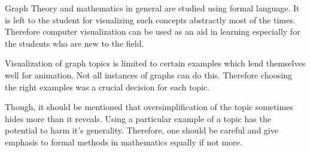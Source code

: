 Graph Theory and mathematics in general are studied using formal language. It
is left to the student for visualizing such concepts abstractly most of the
times. Therefore computer visualization can be used as an aid in learning
especially for the students who are new to the field.

Visualization of graph topics is limited to certain examples which lend
themselves well for animation. Not all instances of graphs can do this.
Therefore choosing the right examples was a crucial decision for each topic.

Though, it should be mentioned that oversimplification of the topic sometimes
hides more than it reveals. Using a particular example of a topic has the
potential to harm it's generality. Therefore, one should be careful and give
emphasis to formal methods in mathematics equally if not more.
